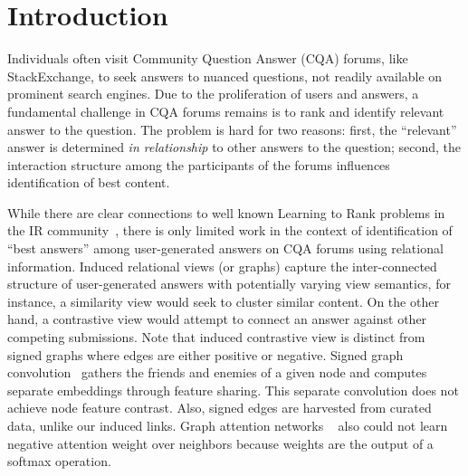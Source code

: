 \section{Introduction}

Individuals often visit Community Question Answer (CQA) forums, like StackExchange, to seek answers to nuanced questions, not readily available on prominent search engines. Due to the proliferation of users and answers, a fundamental challenge in CQA forums remains is to rank and identify relevant answer to the question.
The problem is hard for two reasons: first, the ``relevant'' answer is determined \emph{in relationship} to other answers to the question; second, the interaction structure among the participants of the forums influences identification of best content.


While there are clear connections to well known Learning to Rank problems in the IR community~\cite{LambdaNet, LambdaMart, LearningtoRank}, there is only limited work in the context of identification of ``best answers'' among user-generated answers on CQA forums using relational information. Induced relational views (or graphs) capture the inter-connected structure of user-generated answers with potentially varying view semantics, for instance, a similarity view would seek to cluster similar content. On the other hand, a contrastive view would attempt to connect an answer against other competing submissions. Note that induced contrastive view is distinct from signed graphs where edges are either positive or negative. Signed graph convolution~\cite{signedgcn} gathers the friends and enemies of a given node and computes separate embeddings through feature sharing. This separate convolution does not achieve node feature contrast. Also, signed edges are harvested from curated data, unlike our induced links. Graph attention networks ~\cite{graphattention} also could not learn negative attention weight over neighbors because weights are the output of a softmax operation.


